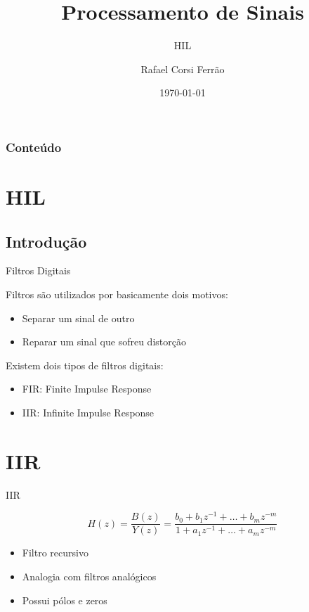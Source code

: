 \documentclass{beamer}
\title{Processamento de Sinais}
\subtitle{HIL}
\author{Rafael Corsi Ferrão}
\date{\today}
\institute{\url{rafael.corsi@maua.br}}
\begin{document}
\begin{frame}[plain,t]
	\titlepage
\end{frame}

\begin{frame}
	\frametitle{Conteúdo}
		\tableofcontents
\end{frame}

\section{HIL}

\subsection{Introdução}

\begin{frame}{Filtros Digitais}

Filtros são utilizados por basicamente dois motivos:

\begin{itemize}
\item Separar um sinal de outro
\item Reparar um sinal que sofreu distorção
\end{itemize}

Existem dois tipos de filtros digitais:

\begin{itemize}
	\item FIR: Finite Impulse Response
	\item IIR: Infinite Impulse Response
\end{itemize}

\end{frame}

\section{IIR}
\begin{frame}{IIR}

	\[
		H(z) = \frac{B(z)}{Y(z)} = \frac{b_0 + b_1 z^{-1} + \ldots + b_m z^{-m}}{1 + a_1 z^{-1} + \ldots + a_m z^{-m}}
	\]


	\begin{itemize}
		\item Filtro recursivo
		\item Analogia com filtros analógicos
		\item Possui pólos e zeros
	\end{itemize}
\end{frame}
\end{document}
